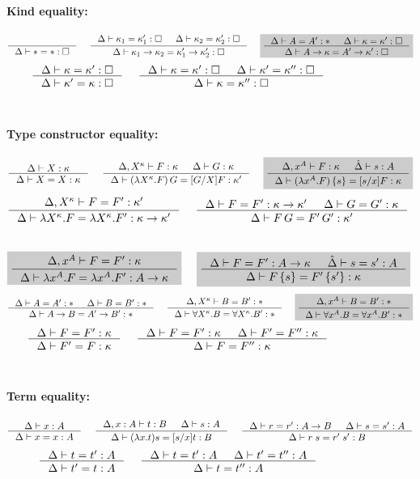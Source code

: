 \begin{figure}
\paragraph{Kind equality:}
\[ \inference{}{\Delta |- * = *:\square}
 ~~~~
   \inference{ \Delta |- \kappa_1 = \kappa_1' : \square
             & \Delta |- \kappa_2 = \kappa_2' : \square }
             {\Delta |- \kappa_1 -> \kappa_2 = \kappa_1' -> \kappa_2' : \square}
 ~~~~ \newFi{
   \inference{\Delta |- A=A':* & \Delta |- \kappa=\kappa':\square}
             {\Delta |- A -> \kappa = A' -> \kappa' : \square} }
\]
\[ \inference{\Delta |- \kappa=\kappa':\square}
             {\Delta |- \kappa'=\kappa:\square}
 ~~~~
   \inference{ \Delta |- \kappa =\kappa' :\square
             & \Delta |- \kappa'=\kappa'':\square}
             {\Delta |- \kappa=\kappa'':\square}
\]
~\\
\paragraph{Type constructor equality:}
\[ \inference{\Delta |- X:\kappa }{\Delta |- X=X:\kappa}
 ~~~~
   \inference{\Delta,X^\kappa |- F:\kappa & \Delta |- G:\kappa}
             {\Delta |- (\lambda X^\kappa.F)\,G = [G/X]F:\kappa'}
 ~~~~ \newFi{
   \inference{\Delta,x^A |- F:\kappa & \hat\Delta |- s:A}
             {\Delta |- (\lambda x^A.F)\,\{s\} = [s/x]F:\kappa} }
\]
\[ \inference{\Delta,X^\kappa |- F=F' : \kappa'}
             {\Delta |- \lambda X^\kappa.F=\lambda X^\kappa.F':\kappa-> \kappa'}
 ~~~~
   \inference{\Delta |- F=F':\kappa->\kappa' & \Delta |- G=G':\kappa}
             {\Delta |- F\,G = F'\,G' : \kappa'}
\]
 ~~~~
\[ \newFi{
   \inference{\Delta,x^A |- F=F' : \kappa}
             {\Delta |- \lambda x^A.F=\lambda x^A.F' : A -> \kappa} }
 ~~~~ \newFi{
   \inference{\Delta |- F=F':A->\kappa & \hat\Delta |- s=s':A}
             {\Delta |- F\,\{s\} = F'\,\{s'\} : \kappa} }
\]
\[ \inference{\Delta |- A=A':* & \Delta |- B=B':*}{\Delta |- A-> B=A'-> B':*}
 ~~~~
   \inference{\Delta,X^\kappa |- B=B':*}
             {\Delta |- \forall X^\kappa.B=\forall X^\kappa.B':*}
 ~~~~ \newFi{
   \inference{\Delta,x^A |- B=B':*}
             {\Delta |- \forall x^A.B=\forall x^A.B':*} }
\]
\[ \inference{\Delta |- F = F' : \kappa}{\Delta |- F' = F : \kappa}
 ~~~~
   \inference{\Delta |- F = F' : \kappa & \Delta |- F' = F'' : \kappa}
             {\Delta |- F = F'' : \kappa}
\]
~\\
\paragraph{Term equality:}
\[ \inference{\Delta |- x:A}{\Delta |- x=x:A}
 ~~~~
   \inference{\Delta,x:A |- t:B & \Delta |- s:A}
             {\Delta |- (\lambda x.t)s=[s/x]t : B}
 ~~~~
   \inference{\Delta |- r=r':A-> B & \Delta |- s=s':A}{\Delta |- r\;s=r'\;s':B}
\]
\[ \inference{\Delta |- t=t':A}{\Delta |- t'=t:A}
 ~~~~
   \inference{\Delta |- t=t':A & \Delta |- t'=t'':A}{\Delta |- t=t'':A}
\]
~\\

\end{figure}
